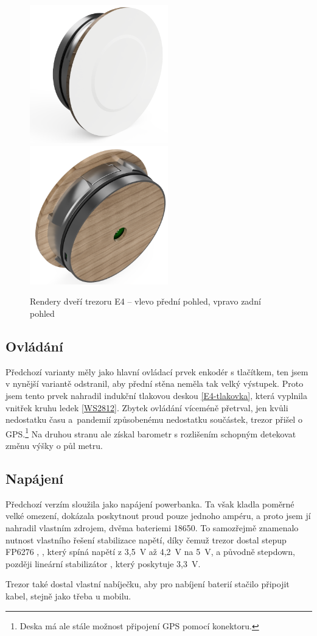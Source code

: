 \begin{figure}[htbp]
    \centering
    \includegraphics[width=170pt]{kapitoly/obrazky/E4/predni_render.png}
    \includegraphics[width=170pt]{kapitoly/obrazky/E4/zadni_render.png}
    \caption{Rendery dveří trezoru E4 -- vlevo přední pohled, vpravo zadní pohled \centering}
    \label{fig:E4-render}
\end{figure}

\subsection*{Ovládání}
Předchozí varianty měly jako hlavní ovládací prvek enkodér s tlačítkem, ten jsem v nynější variantě odstranil, aby přední stěna neměla tak velký 
výstupek. Proto jsem tento prvek nahradil indukční tlakovou deskou \ref{E4-tlakovka}, která vyplnila vnitřek kruhu ledek \ref{WS2812}. 
Zbytek ovládání víceméně přetrval, jen kvůli nedostatku času a~pandemií způsobenému nedostatku součástek, trezor přišel o GPS.\footnote{Deska má ale stále možnost připojení GPS pomocí konektoru.}
Na druhou stranu ale získal barometr s rozlišením schopným detekovat změnu výšky o půl metru.

\subsection*{Napájení}
Předchozí verzím sloužila jako napájení powerbanka. Ta však kladla poměrné velké omezení, dokázala poskytnout proud pouze jednoho ampéru, a proto 
jsem jí nahradil vlastním zdrojem, dvěma bateriemi 18650. 
To samozřejmě znamenalo nutnost vlastního řešení stabilizace napětí, díky čemuž trezor dostal stepup FP6276 \parencite{fp6276a}, , 
který spíná napětí z 3,5~V až 4,2~V na 5~V, a původně stepdown, později lineární stabilizátor , který poskytuje 3,3~V. 

Trezor také dostal vlastní nabíječku, aby pro nabíjení baterií stačilo připojit kabel, stejně jako třeba u mobilu.
